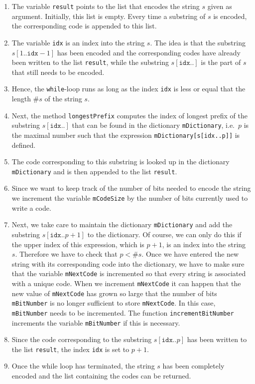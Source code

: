 \begin{enumerate}
\item The variable \texttt{result} points to the list that encodes the string $s$ given as argument.
      Initially, this list is empty.  Every time a substring of $s$ is encoded, the corresponding code
      is appended to this list.
\item The variable \texttt{idx} is an index into the string $s$.  The idea is that the substring
      $s[1..\mathtt{idx}-1]$ has been encoded and the corresponding codes have already been written
      to the list \texttt{result}, while the substring $s[\mathtt{idx}..]$ is
      the part of $s$ that still needs to be encoded.
\item Hence, the \texttt{while}-loop runs as long as the index \texttt{idx} is less or equal that
      the length $\texttt{\#}s$ of the string $s$.
\item Next, the method \texttt{longestPrefix}  computes the index of longest prefix of the substring
      $s[\mathtt{idx}..]$ that can be found in the dictionary \texttt{mDictionary}, i.e.~$p$ is the
      maximal number such that the expression \texttt{mDictionary[s[idx..p]]} is defined.
\item The code corresponding to this substring is looked up in the dictionary \texttt{mDictionary}
      and is then appended to the list \texttt{result}.
\item Since we want to keep track of the number of bits needed to encode the string we increment
      the variable \texttt{mCodeSize} by the number of bits currently used to write a code.
\item Next, we take care to maintain the dictionary \texttt{mDictionary} and add the substring
      $s[\mathtt{idx}..p+1]$ to the dictionary.  Of course, we can only do this if the upper index
      of this expression, which is $p+1$, is an index into the string $s$. 
      Therefore we have to check that $p < \mathtt{\#}s$.
      Once we have entered the
      new string with its corresponding code into the dictionary, we have to make sure that the
      variable \texttt{mNextCode} is incremented so that every string is associated with a unique
      code.  When we increment \texttt{mNextCode} it can happen that the new value of
      \texttt{mNextCode} has grown so large that the number of bits \texttt{mBitNumber} is no
      longer sufficient to store \texttt{mNextCode}.  In this case, \texttt{mBitNumber} needs to be
      incremented.  The function \texttt{incrementBitNumber} increments the variable
      \texttt{mBitNumber} if this is necessary. 
\item Since the code corresponding to the substring $s[\mathtt{idx}..p]$ has been written to the
      list \texttt{result}, the index \texttt{idx} is set to $p+1$.
\item Once the while loop has terminated, the string $s$ has been completely encoded and the list
      containing the codes can be returned.
\end{enumerate}


